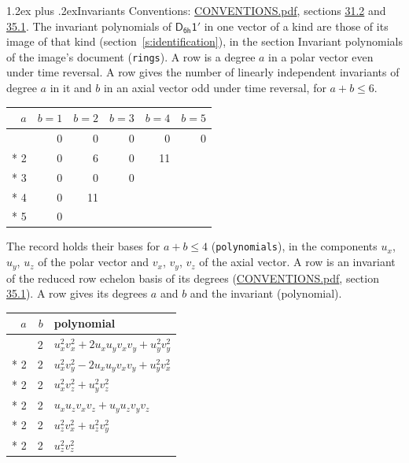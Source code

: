 \documentclass[10pt,a4paper]{article}
\makeatletter
\renewcommand\section{\@startsection{section}{1}{\z@}{-3ex plus -1ex minus -.2ex}%
  {1.2ex plus .2ex}{\normalfont\large\sffamily\bfseries\color{parttitle}}}
\numberwithin{equation}{section}
\newcommand{\grp}[1]{\mathsf{#1}}
\makeatother
\begin{document}
\section{Invariants}\label{s:invariants}
Conventions: \href{../../CONVENTIONS.pdf}{CONVENTIONS.pdf}, sections \href{../../CONVENTIONS.pdf\#conv.31.2}{31.2} and \href{../../CONVENTIONS.pdf\#conv.35.1}{35.1}.
The invariant polynomials of $\grp{D_{6h}1'}$ in one vector of a kind are those of its image of that kind (section~\ref{s:identification}), in the section Invariant polynomials of the image's document (\texttt{rings}).
\leavevmode\label{n:index.degree.polar}\label{n:index.degree.axial}A row is a degree $a$ in a polar vector even under time reversal. A row gives the number of linearly independent invariants of degree $a$ in it and $b$ in an axial vector odd under time reversal, for $a + b \le 6$.
{\small\begin{longtable}{@{}rrrrrr@{}}\toprule
$a$ & $b = 1$ & $b = 2$ & $b = 3$ & $b = 4$ & $b = 5$\\\midrule\endhead
\bottomrule\endfoot\endlastfoot
1 & 0 & 0 & 0 & 0 & 0\\*
2 & 0 & 6 & 0 & 11 & \\*
3 & 0 & 0 & 0 &  & \\*
4 & 0 & 11 &  &  & \\*
5 & 0 &  &  &  & \\
\bottomrule\end{longtable}}
\leavevmode\label{n:local.component.polar}\label{n:local.component.axial}The record holds their bases for $a + b \le 4$ (\texttt{polynomials}), in the components $u_{x}$, $u_{y}$, $u_{z}$ of the polar vector and $v_{x}$, $v_{y}$, $v_{z}$ of the axial vector. \label{n:head.polynomial}A row is an invariant of the reduced row echelon basis of its degrees (\href{../../CONVENTIONS.pdf}{CONVENTIONS.pdf}, section \href{../../CONVENTIONS.pdf\#conv.35.1}{35.1}). A row gives its degrees $a$ and $b$ and the invariant (polynomial).
{\small\renewcommand{\arraystretch}{1.2}\begin{longtable}{@{}rrl@{}}\toprule
$a$ & $b$ & polynomial\\\midrule\endhead
\bottomrule\endfoot\endlastfoot
2 & 2 & $u_{x}^{2}v_{x}^{2} + 2u_{x}u_{y}v_{x}v_{y} + u_{y}^{2}v_{y}^{2}$\\*
2 & 2 & $u_{x}^{2}v_{y}^{2} - 2u_{x}u_{y}v_{x}v_{y} + u_{y}^{2}v_{x}^{2}$\\*
2 & 2 & $u_{x}^{2}v_{z}^{2} + u_{y}^{2}v_{z}^{2}$\\*
2 & 2 & $u_{x}u_{z}v_{x}v_{z} + u_{y}u_{z}v_{y}v_{z}$\\*
2 & 2 & $u_{z}^{2}v_{x}^{2} + u_{z}^{2}v_{y}^{2}$\\*
2 & 2 & $u_{z}^{2}v_{z}^{2}$\\
\bottomrule\end{longtable}}
\end{document}
